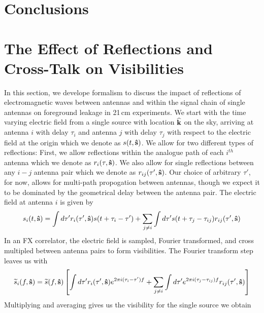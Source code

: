 \documentclass[preprint]{emulateapj}
\begin{document}
\section{Conclusions}
\label{sec:Conclusion}



\appendix
\section{The Effect of Reflections and Cross-Talk on Visibilities}\label{app:Reflections}
In this section, we develope formalism to discuss the impact of reflections of electromagnetic waves between antennas and within the signal chain of single antennas on foreground leakage in 21\,cm experiments. We start with the time varying electric field from a single source with location ${\bf \widehat{k}}$ on the sky, arriving at antenna $i$ with delay $\tau_i$ and antenna $j$ with delay $\tau_j$ with respect to the electric field at the origin which we denote as $s(t,{\bf \hat{s}})$. We allow for two different types of reflections: First, we allow reflections within the analogue path of each $i^{th}$ antenna which we denote as $r_i(\tau,{\bf \hat{s}})$. We also allow for single reflections between any $i-j$ antenna pair which we denote as $r_{ij}(\tau',{\bf \hat{s}})$. Our choice of arbitrary $\tau'$, for now, allows for multi-path propogation between antennas, though we expect it to be dominated by the geometrical delay between the antenna pair. The electric field at antenna $i$ is given by
\begin{equation}
s_i(t,{\bf \hat{s}}) = \int d \tau' r_i(\tau',{\bf \hat{s}})s(t+\tau_i-\tau') + \sum_{j \ne i} \int d \tau' s(t + \tau_j - \tau_{ij}) r_{ij}(\tau',{\bf \hat{s}})
\end{equation}  
In an FX correlator, the electric field is sampled, Fourier transformed, and cross multipled between antenna pairs to form visibilities. The Fourier transform step leaves us with 
\begin{equation}
\widetilde{s}_i(f,{\bf \hat{s}}) = \widetilde{s}(f,{\bf \hat{s}}) \left[ \int d \tau' r_i(\tau',{\bf \hat{s}})e^{2 \pi i(\tau_i - \tau')f} + \sum_{j\ne i} \int d \tau' e^{2 \pi i(\tau_j - \tau_{ij})f} r_{ij}(\tau',{\bf \hat{s}}) \right]
\end{equation}
Multiplying and averaging gives us the visibility for the single source we obtain
\end{document}
